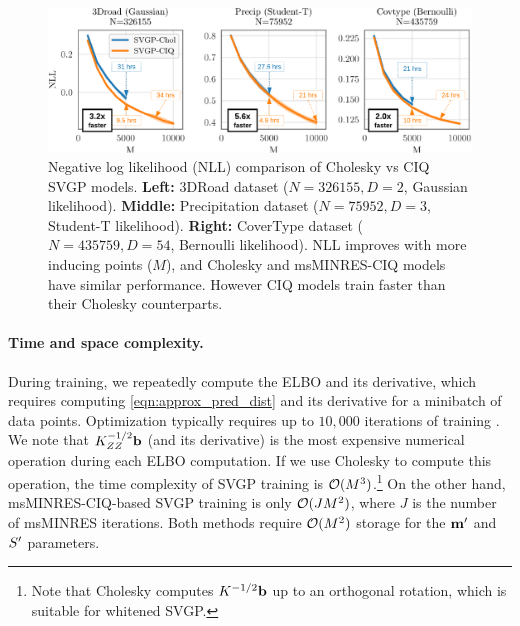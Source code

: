 \begin{figure}[t!]
  \centering
  \includegraphics[width=\linewidth]{figures/variational_nll.pdf}
  \caption[Negative log likelihood (NLL) comparison of Cholesky-whitened vs CIQ-whitened SVGP models.]{
    Negative log likelihood (NLL) comparison of Cholesky vs CIQ SVGP models.
    {\bf Left:} 3DRoad dataset ($N=326155, D=2$, Gaussian likelihood).
    {\bf Middle:} Precipitation dataset ($N=75952, D=3$, Student-T likelihood).
    {\bf Right:} CoverType dataset ($N=435759, D=54$, Bernoulli likelihood).
    NLL improves with more inducing points ($M$), and Cholesky and msMINRES-CIQ models have similar performance.
    However CIQ models train faster than their Cholesky counterparts.
  }
  \label{fig:variational_nll}
\end{figure}

\paragraph{Time and space complexity.}
During training, we repeatedly compute the ELBO and its derivative, which requires computing \cref{eqn:approx_pred_dist} and its derivative for a minibatch of data points.
Optimization typically requires up to $10,\!000$ iterations of training \citep[e.g.][]{salimbeni2018natural}.
We note that $K_{ZZ}^{-1 / 2} \mathbf{b}$ (and its derivative) is the most expensive numerical operation during each ELBO computation.
If we use Cholesky to compute this operation, the time complexity of SVGP training is $\bigo{M^3}$.\footnote{
  Note that Cholesky computes $K^{-1/2} \mathbf{b}$ up to an orthogonal rotation, which is suitable for whitened SVGP.
}
On the other hand, msMINRES-CIQ-based SVGP training is only $\bigo{J M^2}$, where $J$ is the number of msMINRES iterations.
Both methods require $\bigo{M^2}$ storage for the $\mathbf{m}'$ and $S'$ parameters.

